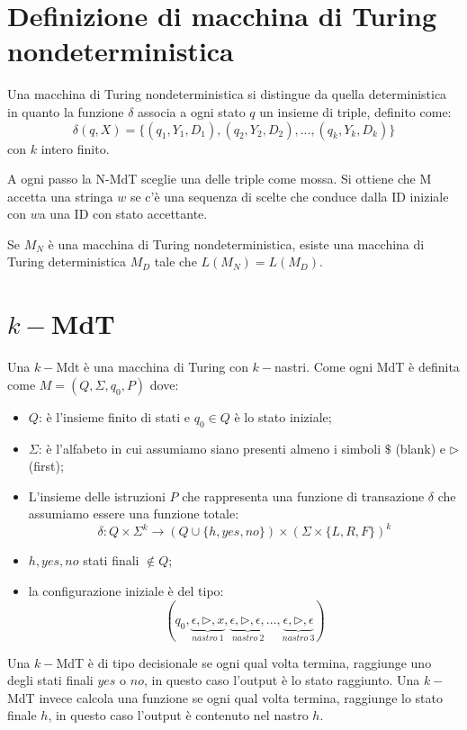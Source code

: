 \section{Definizione di macchina di Turing nondeterministica}
Una macchina di Turing nondeterministica si distingue da quella deterministica in quanto la funzione $\delta$ associa a ogni stato $q$ un insieme di triple, definito come: 
$$
\delta(q,X) = \{(q_1, Y_1, D_1), (q_2, Y_2, D_2),...,(q_k,Y_k, D_k)\}
$$con $k$ intero finito. 

A ogni passo la N-MdT sceglie una delle triple come mossa.
Si ottiene che M accetta una stringa $w$ se c'è una sequenza di scelte che conduce dalla ID iniziale con $w$a una ID con stato accettante. 

\begin{theorem}
    Se $M_N$ è una macchina di Turing nondeterministica, esiste una macchina di Turing deterministica $M_D$ tale che $L(M_N)=L(M_D)$.
\end{theorem}

\section{$k-$MdT ~\cite{4}}
Una $k-$Mdt è una macchina di Turing con $k-$nastri.
Come ogni MdT è definita come $M=(Q, \Sigma, q_0, P)$ dove: 
\begin{itemize}
    \item $Q$: è l'insieme finito di stati e $q_0 \in Q$ è lo stato iniziale; 
    \item $\Sigma$: è l'alfabeto in cui assumiamo siano presenti almeno i simboli $\$$ (blank) e $\triangleright$ (first);
    \item L'insieme delle istruzioni $P$ che rappresenta una funzione di transazione $\delta$ che assumiamo essere una funzione totale: 
    $$
    \delta : Q \times \Sigma^k \rightarrow (Q \cup\{h,yes,no\})\times (\Sigma \times \{L,R,F\})^k
    $$
    \item $h,yes,no$ stati finali $\not\in Q$; 
    \item la configurazione iniziale è del tipo:
    $$
    (q_0, \underbrace{\epsilon, \triangleright, x}_{nastro \ 1}, \underbrace{\epsilon, \triangleright, \epsilon,}_{nastro \ 2}...,\underbrace{\epsilon, \triangleright, \epsilon}_{nastro \ 3})
    $$
\end{itemize}

\begin{definition}
    Una $k-$MdT è di tipo decisionale se ogni qual volta termina, raggiunge uno degli stati finali $yes$ o $no$, in questo caso l'output è lo stato raggiunto. 
    Una $k-$MdT invece calcola una funzione se ogni qual volta termina, raggiunge lo stato finale $h$, in questo caso l'output è contenuto nel nastro $h$. 
\end{definition}

